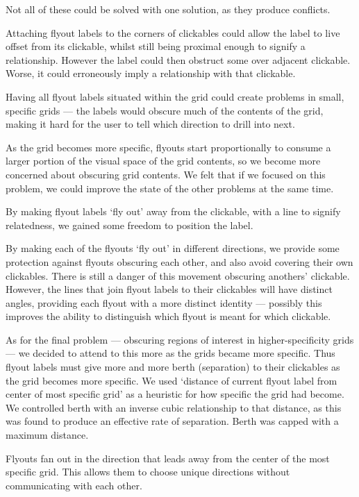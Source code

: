 \documentclass[a4paper, 12pt]{report}
\begin{document}
Not all of these could be solved with one solution, as they produce conflicts.

Attaching flyout labels to the corners of clickables could allow the label to live offset from its clickable, whilst still being proximal enough to signify a relationship. However the label could then obstruct some over adjacent clickable. Worse, it could erroneously imply a relationship with that clickable.

Having all flyout labels situated within the grid could create problems in small, specific grids --- the labels would obscure much of the contents of the grid, making it hard for the user to tell which direction to drill into next.

As the grid becomes more specific, flyouts start proportionally to consume a larger portion of the visual space of the grid contents, so we become more concerned about obscuring grid contents. We felt that if we focused on this problem, we could improve the state of the other problems at the same time.

By making flyout labels `fly out' away from the clickable, with a line to signify relatedness, we gained some freedom to position the label.

By making each of the flyouts `fly out' in different directions, we provide some protection against flyouts obscuring each other, and also avoid covering their own clickables. There is still a danger of this movement obscuring anothers' clickable. However, the lines that join flyout labels to their clickables will have distinct angles, providing each flyout with a more distinct identity --- possibly this improves the ability to distinguish which flyout is meant for which clickable.

As for the final problem --- obscuring regions of interest in higher-specificity grids --- we decided to attend to this more as the grids became more specific. Thus flyout labels must give more and more berth (separation) to their clickables as the grid becomes more specific. We used `distance of current flyout label from center of most specific grid' as a heuristic for how specific the grid had become. We controlled berth with an inverse cubic relationship to that distance, as this was found to produce an effective rate of separation. Berth was capped with a maximum distance.

Flyouts fan out in the direction that leads away from the center of the most specific grid. This allows them to choose unique directions without communicating with each other.
\end{document}
